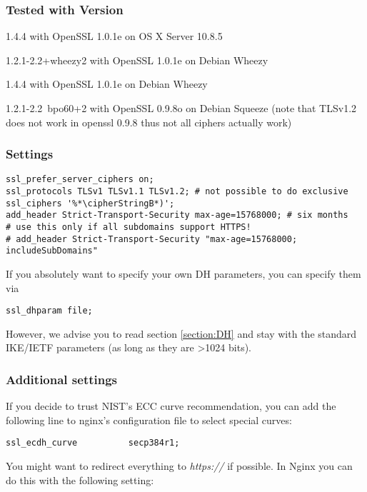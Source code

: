 \subsubsection{Tested with Version} 
\begin{itemize*}
  \item 1.4.4 with OpenSSL 1.0.1e on OS X Server 10.8.5
  \item 1.2.1-2.2+wheezy2 with OpenSSL 1.0.1e on Debian Wheezy
  \item 1.4.4 with OpenSSL 1.0.1e on Debian Wheezy
  \item 1.2.1-2.2~bpo60+2 with OpenSSL 0.9.8o on Debian Squeeze (note that TLSv1.2 does not work in openssl 0.9.8 thus not all ciphers actually work)
\end{itemize*}


\subsubsection{Settings}
\begin{lstlisting}
ssl_prefer_server_ciphers on;
ssl_protocols TLSv1 TLSv1.1 TLSv1.2; # not possible to do exclusive
ssl_ciphers '%*\cipherStringB*)';
add_header Strict-Transport-Security max-age=15768000; # six months
# use this only if all subdomains support HTTPS!
# add_header Strict-Transport-Security "max-age=15768000; includeSubDomains"
\end{lstlisting}

If you absolutely want to specify your own DH parameters, you can specify them via

\begin{lstlisting}
ssl_dhparam file;
\end{lstlisting}

However, we advise you to read section \ref{section:DH} and stay with the standard IKE/IETF parameters (as long as they are \textgreater 1024 bits).

\subsubsection{Additional settings}
If you decide to trust NIST's ECC curve recommendation, you can add the following line to nginx's configuration file to select special curves:

\begin{lstlisting}
ssl_ecdh_curve          secp384r1;
\end{lstlisting}

You might want to redirect everything to \emph{https://} if possible. In Nginx you can do this with the following setting:

